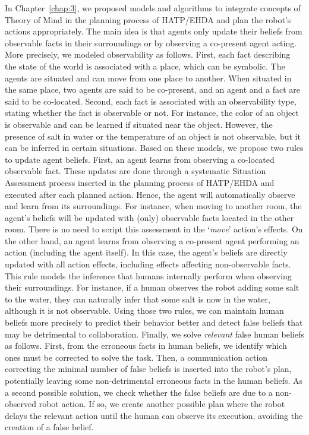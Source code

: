 In Chapter~\ref{chap:3}, we proposed models and algorithms to integrate concepts of Theory of Mind in the planning process of HATP/EHDA and plan the robot's actions appropriately. 
The main idea is that agents only update their beliefs from observable facts in their surroundings or by observing a co-present agent acting. 
More precisely, we modeled observability as follows. First, each fact describing the state of the world is associated with a place, which can be symbolic. The agents are situated and can move from one place to another. When situated in the same place, two agents are said to be co-present, and an agent and a fact are said to be co-located. Second, each fact is associated with an observability type, stating whether the fact is observable or not. For instance, the color of an object is observable and can be learned if situated near the object. However, the presence of salt in water or the temperature of an object is not observable, but it can be inferred in certain situations.
Based on these models, we propose two rules to update agent beliefs. First, an agent learns from observing a co-located observable fact. These updates are done through a systematic Situation Assessment process inserted in the planning process of HATP/EHDA and executed after each planned action. Hence, the agent will automatically observe and learn from its surroundings. For instance, when moving to another room, the agent's beliefs will be updated with (only) observable facts located in the other room.  There is no need to script this assessment in the `\textit{move}' action's effects. On the other hand, an agent learns from observing a co-present agent performing an action (including the agent itself). In this case, the agent's beliefs are directly updated with all action effects, including effects affecting non-observable facts. This rule models the inference that humans internally perform when observing their surroundings. For instance, if a human observes the robot adding some salt to the water, they can naturally infer that some salt is now in the water, although it is not observable.
Using those two rules, we can maintain human beliefs more precisely to predict their behavior better and detect false beliefs that may be detrimental to collaboration. Finally, we solve \textit{relevant} false human beliefs as follows. First, from the erroneous facts in human beliefs, we identify which ones must be corrected to solve the task. Then, a communication action correcting the minimal number of false beliefs is inserted into the robot's plan, potentially leaving some non-detrimental erroneous facts in the human beliefs. As a second possible solution, we check whether the false beliefs are due to a non-observed robot action. If so, we create another possible plan where the robot delays the relevant action until the human can observe its execution, avoiding the creation of a false belief. 
